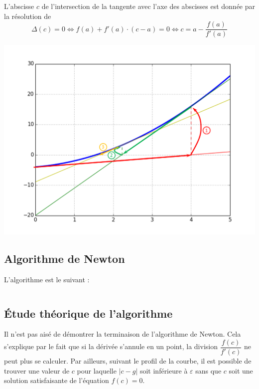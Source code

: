 \documentclass[10pt,fleqn]{article} %
\begin{document}
L'abscisse $c$ de l'intersection de la tangente avec l'axe des abscisses est donnée par la résolution de 
$$
\Delta(c)=0 
\Longleftrightarrow f(a)+ f'(a)\cdot(c-a) = 0
\Longleftrightarrow c = a-\dfrac{f(a)}{f'(a)}
$$

\begin{center}
\includegraphics[width=.7\textwidth]{images/interpretation_newton}
\end{center}
 
\subsection{Algorithme de Newton}

L'algorithme est le suivant :

\ifprof
\begin{pseudo}
\begin{algorithm}[H]
\end{algorithm}
\end{pseudo}
\else 
\newpage
\begin{pseudo}
$$ \quad $$
\vspace{6cm}
$$ \quad $$
\end{pseudo}
\fi

\subsection{Étude théorique de l'algorithme}

Il n'est pas aisé de démontrer la terminaison de l'algorithme de Newton. Cela s'explique par le fait que si la dérivée s'annule en un point, la division $\dfrac{f(c)}{f'(c)}$ ne peut plus se calculer. Par ailleurs, suivant le profil de la courbe, il est possible de trouver une valeur de $c$ pour laquelle $|c-g|$ soit inférieure à $\varepsilon$ sans que $c$ soit une solution satisfaisante de l'équation $f(c)=0$. 
\end{document}
